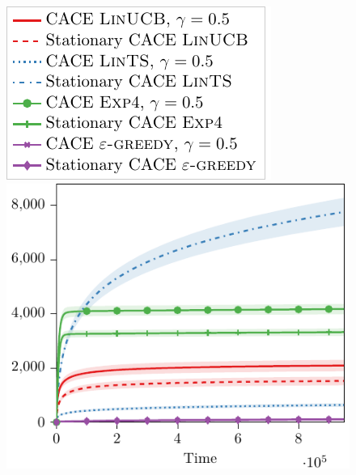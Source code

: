 \begin{figure}
    \centering
    \begin{minipage}{0.25\linewidth}
        \centering
        \includegraphics[width=0.85\linewidth]{images/attack_reward/simulations/legend.pdf}
    \end{minipage}\hfill
    \begin{minipage}{0.25\linewidth}
    \centering
    \includegraphics[width=0.95\linewidth]{images/attack_reward/simulations/cost_attack_reward_simulations.pdf}
    \end{minipage}\hfill
    \begin{minipage}{0.25\linewidth}
    \centering

\end{minipage}
\end{figure}
